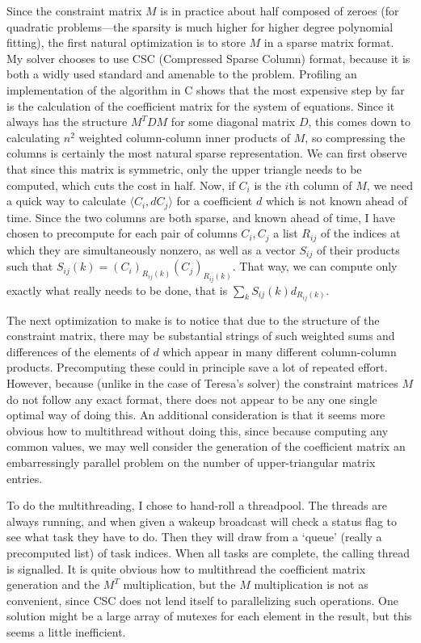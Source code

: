 \documentclass{article}
\begin{document}
Since the constraint matrix $M$ is in practice about half composed of zeroes (for quadratic problems---the sparsity is much higher for higher degree polynomial fitting), the first natural optimization is to store $M$ in a sparse matrix format. My solver chooses to use CSC (Compressed Sparse Column) format, because it is both a widly used standard and amenable to the problem. Profiling an implementation of the algorithm in C shows that the most expensive step by far is the calculation of the coefficient matrix for the system of equations. Since it always has the structure $M^TDM$ for some diagonal matrix $D$, this comes down to calculating $n^2$ weighted column-column inner products of $M$, so compressing the columns is certainly the most natural sparse representation. We can first observe that since this matrix is symmetric, only the upper triangle needs to be computed, which cuts the cost in half. Now, if $C_i$ is the $i$th column of $M$, we need a quick way to calculate $\langle C_i, dC_j\rangle$ for a coefficient $d$ which is not known ahead of time. Since the two columns are both sparse, and known ahead of time, I have chosen to precompute for each pair of columns $C_i, C_j$ a list $R_{ij}$ of the indices at which they are simultaneously nonzero, as well as a vector $S_{ij}$ of their products such that $S_{ij}(k) = (C_i)_{R_{ij}(k)}(C_j)_{R_{ij}(k)}$. That way, we can compute only exactly what really needs to be done, that is $\sum_k S_{ij}(k)d_{R_{ij}(k)}$. 

The next optimization to make is to notice that due to the structure of the constraint matrix, there may be substantial strings of such weighted sums and differences of the elements of $d$ which appear in many different column-column products. Precomputing these could in principle save a lot of repeated effort. However, because (unlike in the case of Teresa's solver) the constraint matrices $M$ do not follow any exact format, there does not appear to be any one single optimal way of doing this. An additional consideration is that it seems more obvious how to multithread without doing this, since because computing any common values, we may well consider the generation of the coefficient matrix an embarressingly parallel problem on the number of upper-triangular matrix entries. 

To do the multithreading, I chose to hand-roll a threadpool. The threads are always running, and when given a wakeup broadcast will check a status flag to see what task they have to do. Then they will draw from a `queue' (really a precomputed list) of task indices. When all tasks are complete, the calling thread is signalled. It is quite obvious how to multithread the coefficient matrix generation and the $M^T$ multiplication, but the $M$ multiplication is not as convenient, since CSC does not lend itself to parallelizing such operations. One solution might be a large array of mutexes for each element in the result, but this seems a little inefficient. 
\end{document}
